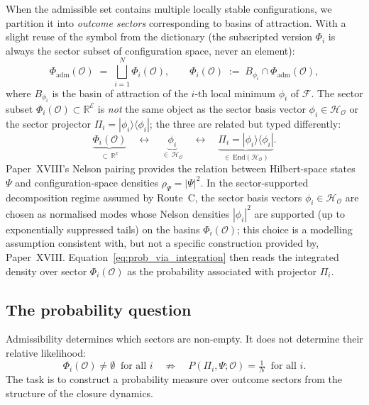 \documentclass[12pt]{article}
\newcommand{\Ecal}{\mathcal{E}}
\newcommand{\Fcal}{\mathcal{F}}
\newcommand{\Ocal}{\mathcal{O}}
\newcommand{\Hcal}{\mathcal{H}}
\begin{document}
When the admissible set contains multiple locally stable configurations, we partition it into \emph{outcome sectors} corresponding to basins of attraction. With a slight reuse of the symbol from the dictionary (the subscripted version $\Phi_i$ is always the sector subset of configuration space, never an element):
\begin{equation}\label{eq:sector_partition}
    \Phi_{\mathrm{adm}}(\Ocal) \;=\; \bigsqcup_{i=1}^{N} \Phi_i(\Ocal), \qquad \Phi_i(\Ocal) \;:=\; B_{\phi_i} \cap \Phi_{\mathrm{adm}}(\Ocal),
\end{equation}
where $B_{\phi_i}$ is the basin of attraction of the $i$-th local minimum $\phi_i$ of $\Fcal$. The sector subset $\Phi_i(\Ocal) \subset \mathbb{R}^\Ecal$ is \emph{not} the same object as the sector basis vector $\phi_i \in \Hcal_\Ocal$ or the sector projector $\Pi_i = |\phi_i\rangle\langle\phi_i|$; the three are related but typed differently:
\begin{equation}
    \underbrace{\Phi_i(\Ocal)}_{\subset\,\mathbb{R}^\Ecal}
    \quad\longleftrightarrow\quad
    \underbrace{\phi_i}_{\in\,\Hcal_\Ocal}
    \quad\longleftrightarrow\quad
    \underbrace{\Pi_i = |\phi_i\rangle\langle\phi_i|}_{\in\,\mathrm{End}(\Hcal_\Ocal)}.
\end{equation}
Paper~XVIII's Nelson pairing provides the relation between Hilbert-space states $\Psi$ and configuration-space densities $\rho_\Psi = |\Psi|^2$. In the sector-supported decomposition regime assumed by Route~C, the sector basis vectors $\phi_i \in \Hcal_\Ocal$ are chosen as normalised modes whose Nelson densities $|\phi_i|^2$ are supported (up to exponentially suppressed tails) on the basins $\Phi_i(\Ocal)$; this choice is a modelling assumption consistent with, but not a specific construction provided by, Paper~XVIII. Equation~\eqref{eq:prob_via_integration} then reads the integrated density over sector $\Phi_i(\Ocal)$ as the probability associated with projector $\Pi_i$.

\subsection{The probability question}

Admissibility determines which sectors are non-empty. It does not determine their relative likelihood:
\begin{equation}\label{eq:not_equal}
    \Phi_i(\Ocal) \neq \emptyset \;\;\text{for all } i \quad \not\Rightarrow \quad P(\Pi_i, \Psi; \Ocal) = \tfrac{1}{N} \;\;\text{for all } i.
\end{equation}
The task is to construct a probability measure over outcome sectors from the structure of the closure dynamics.
\end{document}

